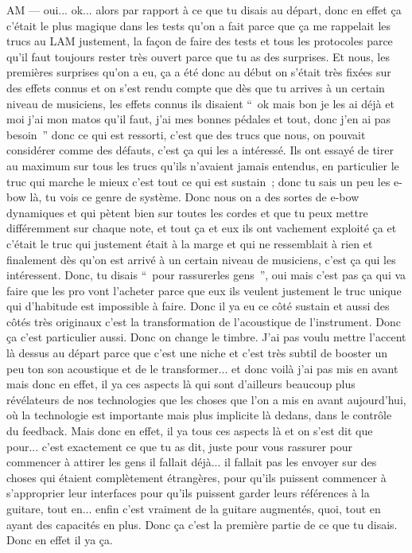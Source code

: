 AM — oui... ok... alors par rapport à ce que tu disais au départ, donc en effet ça c'était le plus magique dans les tests qu'on a fait parce que ça me rappelait les trucs au LAM justement, la façon de faire des tests et tous les protocoles parce qu'il faut toujours rester très ouvert parce que tu as des surprises. Et nous, les premières surprises qu'on a eu, ça a été donc au début on s'était très fixées sur des effets connus et on s'est rendu compte que dès que tu arrives à un certain niveau de musiciens, les effets connus ils disaient “ ok mais bon je les ai déjà et moi j'ai mon matos qu'il faut, j'ai mes bonnes pédales et tout, donc j'en ai pas besoin ” donc ce qui est ressorti, c'est que des trucs que nous, on pouvait considérer comme des défauts, c'est ça qui les a intéressé. Ils ont essayé de tirer au maximum sur tous les trucs qu'ils n'avaient jamais entendus, en particulier le truc qui marche le mieux c'est tout ce qui est sustain ; donc tu sais un peu les e-bow là, tu vois ce genre de système. Donc nous on a des sortes de e-bow dynamiques et qui pètent bien sur toutes les cordes et que tu peux mettre différemment sur chaque note, et tout ça et eux ils ont vachement exploité ça et c'était le truc qui justement était à la marge et qui ne ressemblait à rien et finalement dès qu'on est arrivé à un certain niveau de musiciens, c'est ça qui les intéressent. Donc, tu disais “ pour rassurerles gens ”, oui mais c'est pas ça qui va faire que les pro vont l'acheter parce que eux ils veulent justement le truc unique qui d'habitude est impossible à faire. Donc il ya eu ce côté sustain et aussi des côtés très originaux c'est la transformation de l'acoustique de l'instrument. Donc ça c'est particulier aussi. Donc on change le timbre. J'ai pas voulu mettre l'accent là dessus au départ parce que c'est une niche et c'est très subtil de booster un peu ton son acoustique et de le transformer... et donc voilà j'ai pas mis en avant mais donc en effet, il ya ces aspects là qui sont d'ailleurs beaucoup plus révélateurs de nos technologies que les choses que l'on a mis en avant aujourd'hui, où la technologie est importante mais plus implicite là dedans, dans le contrôle du feedback. Mais donc en effet, il ya tous ces aspects là et on s'est dit que pour... c'est exactement ce que tu as dit, juste pour vous rassurer pour commencer à attirer les gens il fallait déjà... il fallait pas les envoyer sur des choses qui étaient complètement étrangères, pour qu'ils puissent commencer à s'approprier leur interfaces pour qu'ils puissent garder leurs références à la guitare, tout en... enfin c'est vraiment de la guitare augmentés, quoi, tout en ayant des capacités en plus. Donc ça c'est la première partie de ce que tu disais. Donc en effet il ya ça. 

